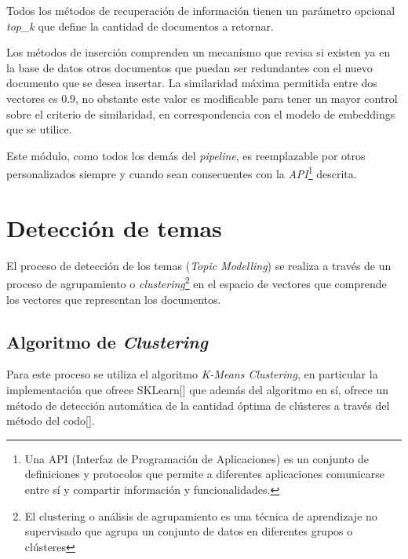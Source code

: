         Todos los métodos de recuperación de información tienen un parámetro opcional \emph{top\_k} que define la cantidad de documentos a retornar.

        Los métodos de inserción comprenden un mecanísmo que revisa si existen ya en la base de datos otros documentos que puedan ser redundantes con el nuevo documento que se desea insertar. La similaridad máxima permitida entre dos vectores es 0.9, no obstante este valor es modificable para tener un mayor control sobre el criterio de similaridad, en correspondencia con el modelo de embeddings que se utilice.

        Este módulo, como todos los demás del \emph{pipeline}, es reemplazable por otros personalizados siempre y cuando sean consecuentes con la \emph{API}\footnote{Una API (Interfaz de Programación de Aplicaciones) es un conjunto de definiciones y protocolos que permite a diferentes aplicaciones comunicarse entre sí y compartir información y funcionalidades.} descrita.

\section{Detección de temas}
    El proceso de detección de los temas (\emph{Topic Modelling}) se realiza a través de un proceso de agrupamiento o \emph{clustering}\footnote{El clustering o análisis de agrupamiento es una técnica de aprendizaje no supervisado que agrupa un conjunto de datos en diferentes grupos o cl\'usteres} en el espacio de vectores que comprende los vectores que representan los documentos.

    \subsection{Algoritmo de \emph{Clustering}}
        Para este proceso se utiliza el algoritmo \emph{K-Means Clustering}, en particular la implementación que ofrece SKLearn[\cite{sklearn}] que además del algoritmo en sí, ofrece un método de detección automática de la cantidad óptima de cl\'usteres a través del método del codo[\cite{elbow}].
    
